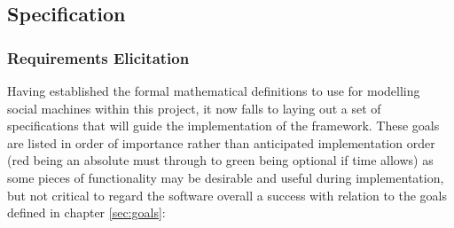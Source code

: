 \documentclass[12pt]{article}
\begin{document}
	\clearpage\subsection{Specification}
		\subsubsection{Requirements Elicitation}\label{sec:req}
			Having established the formal mathematical definitions to use for modelling social machines within this project, it now falls to laying out a set of specifications that will guide the implementation of the framework.
			These goals are listed in order of importance rather than anticipated implementation order (red being an absolute must through to green being optional if time allows) as some pieces of functionality may be desirable and useful during implementation, but not critical to regard the software overall a success with relation to the goals defined in chapter \ref{sec:goals}:
			\vfill
\end{document}
